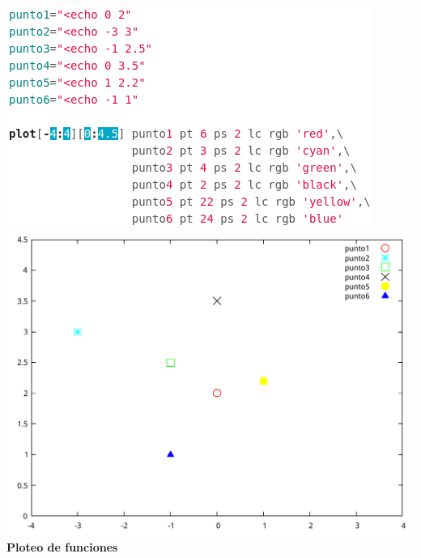 \documentclass[11.5pt,a4paper]{article}
\begin{document}
\includegraphics[scale=0.50]{screen1.png} 
\includegraphics[scale=0.40]{ejemplo1.pdf}\\

\textbf{Ploteo de funciones}\\
 
\end{document}

